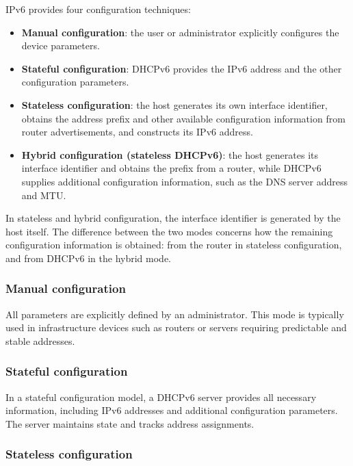 IPv6 provides four configuration techniques:

\begin{itemize}
	\item \textbf{Manual configuration}: the user or administrator
	explicitly configures the device parameters.
	\item \textbf{Stateful configuration}: DHCPv6 provides the IPv6 address
	and the other configuration parameters.
	\item \textbf{Stateless configuration}: the host generates its own
	interface identifier, obtains the address prefix and other available
	configuration information from router advertisements, and constructs
	its IPv6 address.
	\item \textbf{Hybrid configuration (stateless DHCPv6)}: the host
	generates its interface identifier and obtains the prefix from a
	router, while DHCPv6 supplies additional configuration information,
	such as the DNS server address and MTU.
\end{itemize}

In stateless and hybrid configuration, the interface identifier is
generated by the host itself. The difference between the two modes
concerns how the remaining configuration information is obtained:
from the router in stateless configuration, and from DHCPv6 in the
hybrid mode.

\subsubsection*{Manual configuration}

All parameters are explicitly defined by an administrator. This mode is typically used in infrastructure devices such as routers or servers requiring predictable and stable addresses.

\subsubsection*{Stateful configuration}

In a stateful configuration model, a DHCPv6 server provides all necessary information, including IPv6 addresses and additional configuration parameters. The server maintains state and tracks address assignments.

\subsubsection*{Stateless configuration}


